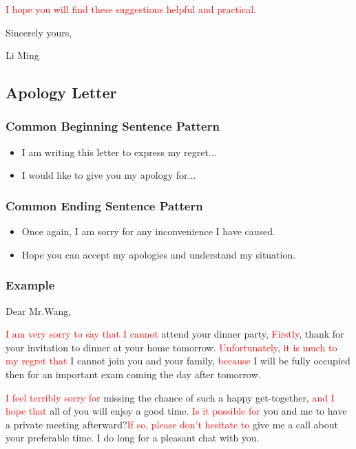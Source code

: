 \documentclass{article}
\begin{document}
\par \textcolor{red}{I hope you will find these suggestions helpful and practical}.


\hfill Sincerely yours,

\hfill Li Ming

\subsection{Apology Letter}
\label{sec:letter}

\subsubsection{Common Beginning Sentence Pattern}
\label{sec:comm-begnn-sent}
\begin{itemize}
\item I am writing this letter to express my regret...
\item I would like to give you my apology for...
\end{itemize}

\subsubsection{Common Ending Sentence Pattern}
\label{sec:comm-ending-sent-2}
\begin{itemize}
\item Once again, I am sorry for any inconvenience I have caused.
\item Hope you can accept my apologies and understand my situation.
\end{itemize}

\subsubsection{Example}
\label{sec:example-2}
Dear Mr.Wang,
\par \textcolor{red}{I am very sorry to say that I cannot }attend your dinner party,
\textcolor{red} {Firstly}, thank for your invitation to dinner at your home
tomorrow. \textcolor{red}{Unfortunately}, \textcolor{red}{it is much to my regret that} I
cannot join you and your family, \textcolor{red}{because} I will be fully occupied then
for an important exam coming the day after tomorrow.

\par \textcolor{red}{I feel terribly sorry for} missing the chance of such a happy
get-together, \textcolor{red}{and I hope that} all of you will enjoy a good
time. \textcolor{red}{Is it possible for} you and me to have a private meeting
afterward?\textcolor{red}{If so, please don't hesitate to }give me a call about your
preferable time. I do long for a pleasant chat with you.
\end{document}
